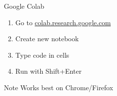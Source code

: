 \begin{frame}{Google Colab}
    \begin{enumerate}
      \item Go to \url{colab.research.google.com}
      \item Create new notebook
      \item Type code in cells
      \item Run with Shift+Enter
    \end{enumerate}
    
    \begin{alertblock}{Note}
      Works best on Chrome/Firefox
    \end{alertblock}
  \end{frame}